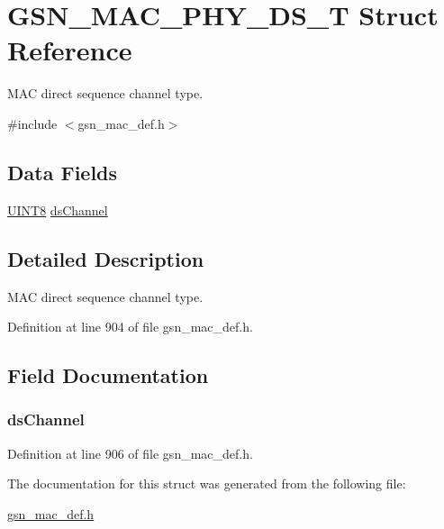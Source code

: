 \hypertarget{a00119}{
\section{GSN\_\-MAC\_\-PHY\_\-DS\_\-T Struct Reference}
\label{a00119}
}


MAC direct sequence channel type.  




{\ttfamily \#include $<$gsn\_\-mac\_\-def.h$>$}

\subsection*{Data Fields}
\begin{DoxyCompactItemize}
\item 
\hyperlink{a00660_gab27e9918b538ce9d8ca692479b375b6a}{UINT8} \hyperlink{a00119_a4305f40cfd261a2a8ef6ad7bb3b4d260}{dsChannel}
\end{DoxyCompactItemize}


\subsection{Detailed Description}
MAC direct sequence channel type. 

Definition at line 904 of file gsn\_\-mac\_\-def.h.



\subsection{Field Documentation}
\hypertarget{a00119_a4305f40cfd261a2a8ef6ad7bb3b4d260}{
\subsubsection[{dsChannel}]{ {\bf dsChannel}}}
\label{a00119_a4305f40cfd261a2a8ef6ad7bb3b4d260}


Definition at line 906 of file gsn\_\-mac\_\-def.h.



The documentation for this struct was generated from the following file:\begin{DoxyCompactItemize}
\item 
\hyperlink{a00522}{gsn\_\-mac\_\-def.h}\end{DoxyCompactItemize}
